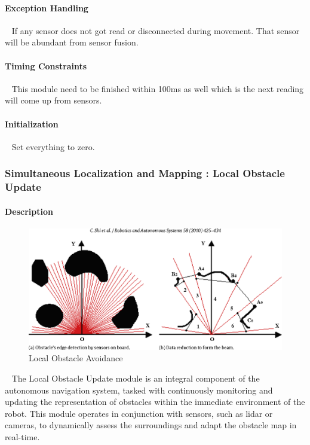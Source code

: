 \documentclass[12pt]{article}
\begin{document}
            \paragraph{Exception Handling}
                ~\newline
                If any sensor does not got read or disconnected during movement. That sensor will be abundant from sensor fusion. 
                
            \paragraph{Timing Constraints}
                ~\newline
                This module need to be finished within 100ms as well which is the next reading will come up from sensors. 
                
            \paragraph{Initialization}
                ~\newline
                Set everything to zero. 
                
        \newpage
        \subsubsection{Simultaneous Localization and Mapping : Local Obstacle Update}
            \paragraph{Description}
                \begin{figure}[H]
                    \centering
                    \includegraphics[width=\textwidth,height=\textheight,keepaspectratio]{../local_obstacle_avoidence.png}
                    \caption{Local Obstacle Avoidance}
                \end{figure}  
                ~\newline
                The Local Obstacle Update module is an integral component of the autonomous navigation system, tasked with continuously monitoring and updating the representation of obstacles within the immediate environment of the robot. This module operates in conjunction with sensors, such as lidar or cameras, to dynamically assess the surroundings and adapt the obstacle map in real-time. \\ 
\end{document}
